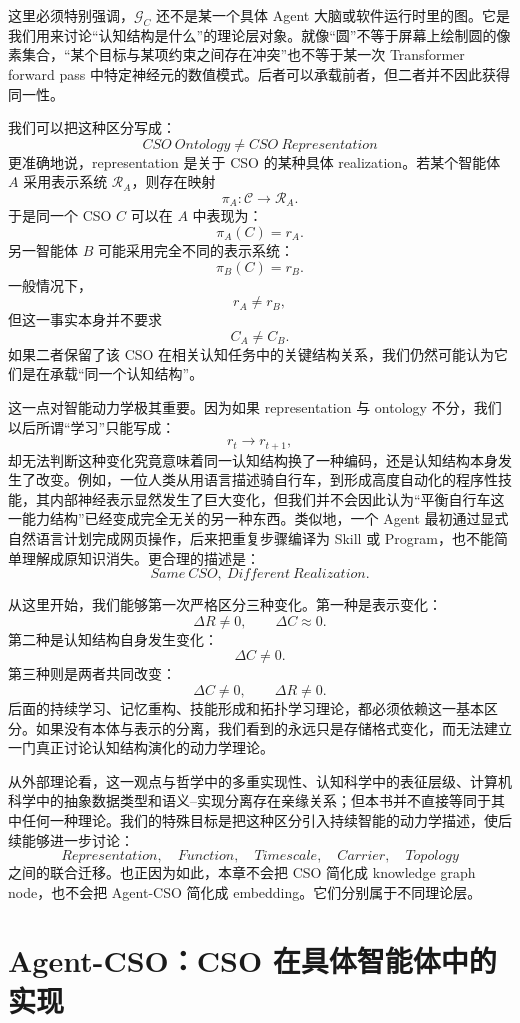 这里必须特别强调，$\mathcal G_C$ 还不是某一个具体 Agent 大脑或软件运行时里的图。它是我们用来讨论“认知结构是什么”的理论层对象。就像“圆”不等于屏幕上绘制圆的像素集合，“某个目标与某项约束之间存在冲突”也不等于某一次 Transformer forward pass 中特定神经元的数值模式。后者可以承载前者，但二者并不因此获得同一性。

我们可以把这种区分写成：
\[
\boxed{
CSO\ Ontology
\neq
CSO\ Representation
}
\]
更准确地说，representation 是关于 CSO 的某种具体 realization。若某个智能体 $A$ 采用表示系统 $\mathcal R_A$，则存在映射
\[
\pi_A:
\mathcal C
\rightarrow
\mathcal R_A.
\]
于是同一个 CSO $C$ 可以在 $A$ 中表现为：
\[
\pi_A(C)=r_A.
\]
另一智能体 $B$ 可能采用完全不同的表示系统：
\[
\pi_B(C)=r_B.
\]
一般情况下，
\[
r_A\neq r_B,
\]
但这一事实本身并不要求
\[
C_A\neq C_B.
\]
如果二者保留了该 CSO 在相关认知任务中的关键结构关系，我们仍然可能认为它们是在承载“同一个认知结构”。

这一点对智能动力学极其重要。因为如果 representation 与 ontology 不分，我们以后所谓“学习”只能写成：
\[
r_t\rightarrow r_{t+1},
\]
却无法判断这种变化究竟意味着同一认知结构换了一种编码，还是认知结构本身发生了改变。例如，一位人类从用语言描述骑自行车，到形成高度自动化的程序性技能，其内部神经表示显然发生了巨大变化，但我们并不会因此认为“平衡自行车这一能力结构”已经变成完全无关的另一种东西。类似地，一个 Agent 最初通过显式自然语言计划完成网页操作，后来把重复步骤编译为 Skill 或 Program，也不能简单理解成原知识消失。更合理的描述是：
\[
\boxed{
Same\ CSO,\ Different\ Realization.
}
\]

从这里开始，我们能够第一次严格区分三种变化。第一种是表示变化：
\[
\Delta R\neq0,
\qquad
\Delta C\approx0.
\]
第二种是认知结构自身发生变化：
\[
\Delta C\neq0.
\]
第三种则是两者共同改变：
\[
\Delta C\neq0,
\qquad
\Delta R\neq0.
\]
后面的持续学习、记忆重构、技能形成和拓扑学习理论，都必须依赖这一基本区分。如果没有本体与表示的分离，我们看到的永远只是存储格式变化，而无法建立一门真正讨论认知结构演化的动力学理论。

从外部理论看，这一观点与哲学中的多重实现性、认知科学中的表征层级、计算机科学中的抽象数据类型和语义--实现分离存在亲缘关系；但本书并不直接等同于其中任何一种理论。我们的特殊目标是把这种区分引入持续智能的动力学描述，使后续能够进一步讨论：
\[
Representation,
\quad
Function,
\quad
Timescale,
\quad
Carrier,
\quad
Topology
\]
之间的联合迁移。也正因为如此，本章不会把 CSO 简化成 knowledge graph node，也不会把 Agent-CSO 简化成 embedding。它们分别属于不同理论层。

\section{Agent-CSO：CSO 在具体智能体中的实现}

